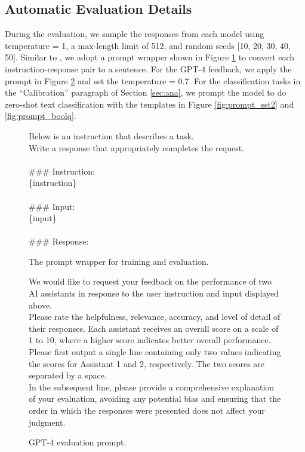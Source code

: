 \documentclass{article}
\begin{document}
\subsection{Automatic Evaluation Details}
\label{app:eval_detail}
During the evaluation, we sample the responses from each model using temperature = 1, a max-length limit of 512, and random seeds [10, 20, 30, 40, 50]. Similar to \cite{alpaca}, we adopt a prompt wrapper shown in Figure \ref{fig:prompt_wrapper} to convert each instruction-response pair to a sentence. For the GPT-4 feedback, we apply the prompt in Figure \ref{fig:prompt_gpt4} and set the temperature = 0.7. For the classification tasks in the ``Calibration'' paragraph of Section \ref{sec:ana}, we prompt the model to do zero-shot text classification with the templates in Figure \ref{fig:prompt_sst2} and \ref{fig:prompt_boolq}.

\begin{figure}[t]
    \begin{tcolorbox}
    Below is an instruction that describes a task. \\
    Write a response that appropriately completes the request. \\ \\
    \#\#\# Instruction: \\
    \{instruction\} \\ \\
    \#\#\# Input: \\
    \{input\} \\ \\
    \#\#\# Response:
    \end{tcolorbox}
    \caption{The prompt wrapper for training and evaluation.}
    \label{fig:prompt_wrapper}
\end{figure}

\begin{figure}
    \begin{tcolorbox}
        We would like to request your feedback on the performance of two AI assistants in response to the user instruction and input displayed above. \\
        Please rate the helpfulness, relevance, accuracy, and level of detail of their responses. Each assistant receives an overall score on a scale of 1 to 10, where a higher score indicates better overall performance. \\
        Please first output a single line containing only two values indicating the scores for Assistant 1 and 2, respectively. The two scores are separated by a space. \\
        In the subsequent line, please provide a comprehensive explanation of your evaluation, avoiding any potential bias and ensuring that the order in which the responses were presented does not affect your judgment.
    \end{tcolorbox}
    \caption{GPT-4 evaluation prompt.}
    \label{fig:prompt_gpt4}
\end{figure}
\end{document}
